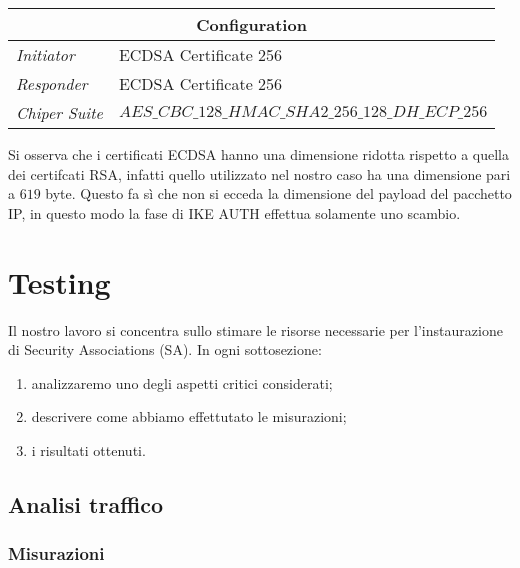 \documentclass[
10pt, %
a4paper, %
oneside, %
headinclude,footinclude, %
BCOR5mm, %
]{scrartcl}
\begin{document}
\begin{center}
    \setlength{\arrayrulewidth}{0.4mm}
    \renewcommand{\arraystretch}{1.3}
    \begin{tabular}{|l|l|}
        \hline
        \multicolumn{2}{|c|}{\textbf{Configuration}} \\
        \hline
        \textit{Initiator} & ECDSA Certificate 256\\
        \textit{Responder} & ECDSA Certificate 256 \\
        \textit{Chiper Suite} & $AES\_CBC\_128\_HMAC\_SHA2\_256\_128\_DH\_ECP\_256$ \\
        \hline
    \end{tabular}
\end{center}
\vspace*{0.2cm}
\noindent
Si osserva che i certificati ECDSA hanno una dimensione ridotta rispetto a quella dei certifcati RSA, infatti quello utilizzato nel
nostro caso ha una dimensione pari a $619$ byte. Questo fa sì che non si ecceda la dimensione del payload del pacchetto IP, in questo
modo la fase di IKE AUTH effettua solamente uno scambio.

\newpage
\section{Testing}

Il nostro lavoro si concentra sullo stimare le risorse necessarie per l'instaurazione di Security Associations (SA). In ogni sottosezione:
\begin{enumerate}
    \item analizzaremo uno degli aspetti critici considerati;
    \item descrivere come abbiamo effettutato le misurazioni;
    \item i risultati ottenuti.
\end{enumerate}


\subsection{Analisi traffico}

\subsubsection{Misurazioni}
\end{document}
